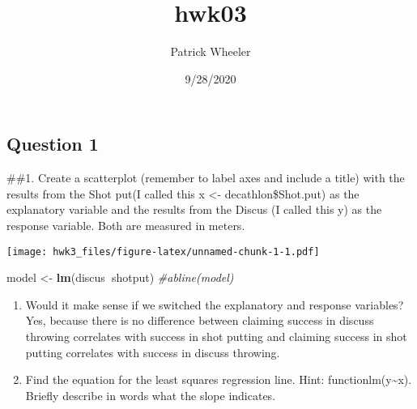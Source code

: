 \documentclass[
]{article}
\title{hwk03}
\author{Patrick Wheeler}
\date{9/28/2020}
\newenvironment{Shaded}{\begin{snugshade}}{\end{snugshade}}
\newcommand{\CommentTok}[1]{\textcolor[rgb]{0.56,0.35,0.01}{\textit{#1}}}
\newcommand{\KeywordTok}[1]{\textcolor[rgb]{0.13,0.29,0.53}{\textbf{#1}}}
\newcommand{\NormalTok}[1]{#1}
\newcommand{\OperatorTok}[1]{\textcolor[rgb]{0.81,0.36,0.00}{\textbf{#1}}}
\newcommand{\StringTok}[1]{\textcolor[rgb]{0.31,0.60,0.02}{#1}}
\providecommand{\tightlist}{%
  \setlength{\itemsep}{0pt}\setlength{\parskip}{0pt}}
\begin{document}
\maketitle

\hypertarget{question-1}{%
\subsection{Question 1}\label{question-1}}

\#\#1. Create a scatterplot (remember to label axes and include a title)
with the results from the Shot put(I called this x \textless-
decathlon\$Shot.put) as the explanatory variable and the results from
the Discus (I called this y) as the response variable. Both are measured
in meters.

\begin{Shaded}
\end{Shaded}

\texttt{[image: hwk3\_files/figure-latex/unnamed-chunk-1-1.pdf]}

\begin{Shaded}
\begin{Highlighting}[]
\NormalTok{model <-}\StringTok{ }\KeywordTok{lm}\NormalTok{(discus}\OperatorTok{~}\NormalTok{shotput)}
\CommentTok{#abline(model)}
\end{Highlighting}
\end{Shaded}

\begin{enumerate}
\def\labelenumi{(\alph{enumi})}
\tightlist
\item
  Would it make sense if we switched the explanatory and response
  variables?\\
  Yes, because there is no difference between claiming success in
  discuss throwing correlates with success in shot putting and claiming
  success in shot putting correlates with success in discuss throwing.\\
\item
  Find the equation for the least squares regression line. Hint:
  functionlm(y\textasciitilde x). Briefly describe in words what the
  slope indicates.
\end{enumerate}
\end{document}
